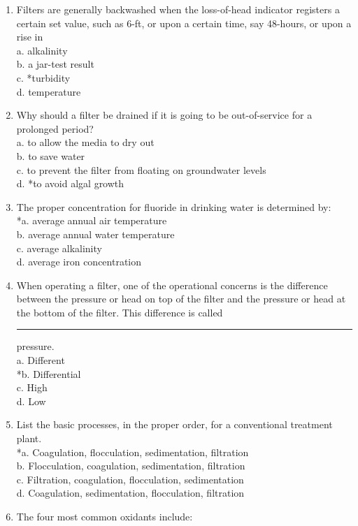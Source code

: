 \begin{enumerate}
\item Filters are generally backwashed when the loss-of-head indicator registers a certain set value, such as 6-ft, or upon a certain time, say 48-hours, or upon a rise in\\
a. alkalinity\\
b. a jar-test result\\
c. *turbidity\\
d. temperature\\
\item Why should a filter be drained if it is going to be out-of-service for a prolonged period?\\
a. to allow the media to dry out\\
b. to save water\\
c. to prevent the filter from floating on groundwater levels\\
d. *to avoid algal growth\\
\item The proper concentration for fluoride in drinking water is determined by:\\
*a. average annual air temperature\\
b.  average annual water  temperature\\
c.  average alkalinity\\
d.	average iron concentration\\
\item When operating a filter, one of the operational concerns is the difference between the pressure or head on top of the filter and the pressure or head at the bottom of the filter. This difference is called \rule{1.5cm}{0.5pt} pressure.\\
a. Different\\
*b. Differential\\
c. High\\
d. Low\\
\item List the basic processes, in the proper order, for a conventional treatment plant.\\
*a. Coagulation, flocculation, sedimentation, filtration\\
b. Flocculation, coagulation, sedimentation, filtration\\
c. Filtration, coagulation, flocculation, sedimentation\\
d. Coagulation, sedimentation, flocculation, filtration\\
\item The four most common oxidants include:\\

\end{enumerate}

